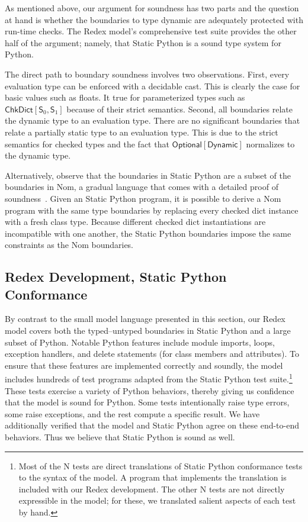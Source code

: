 \documentclass[english,cleveref,submission]{programming}
\newcommand{\SP}{Static Python}
\newcommand{\typefont}[1]{\mathsf{#1}}
\newcommand{\paramtype}[2]{#1[#2]}
\newcommand{\spteval}{\typefont{S}}
\newcommand{\sptdyn}{\typefont{Dynamic}}
\newcommand{\sptoptional}[1]{\paramtype{\typefont{Optional}}{#1}}
\newcommand{\sptchkdict}[2]{\paramtype{\typefont{ChkDict}}{#1, #2}}
\begin{document}
As mentioned above, our argument for soundness has two parts
and the question at hand is whether the boundaries to type dynamic
are adequately protected with run-time checks.
The Redex model's comprehensive test suite provides the other half of the
argument; namely, that \SP{} is a sound type system for Python.

The direct path to boundary soundness involves two observations.
First, every evaluation type can be enforced with a decidable cast.
This is clearly the case for basic values such as floats.
It true for parameterized types such as $\sptchkdict{\spteval_0}{\spteval_1}$
because of their strict semantics.
Second, all boundaries relate the dynamic type to an evaluation type.
There are no significant boundaries that relate a partially static type
to an evaluation type.
This is due to the strict semantics for checked types and the fact that
$\sptoptional{\sptdyn}$ normalizes to the dynamic type.

Alternatively, observe that the boundaries in \SP{} are a subset
of the boundaries in Nom, a gradual language that comes with a detailed
proof of soundness~\cite{mt-oopsla-2017,mt-oopsla-2021}.
Given an \SP{} program, it is possible to derive a Nom program with
the same type boundaries by replacing every checked dict instance
with a fresh class type.
Because different checked dict instantiations are incompatible with
one another, the \SP{} boundaries impose the same constraints as the Nom
boundaries.


\subsection{Redex Development, \SP{} Conformance}

By contrast to the small model language presented in this section,
our Redex model covers both the typed--untyped boundaries in \SP{}
and a large subset of Python.
Notable Python features include module imports, loops, exception handlers, and
delete statements (for class members and attributes).
To ensure that these features are implemented correctly and soundly, the
model includes hundreds of test programs adapted from the \SP{} test suite.\footnote{
  Most of the N tests are direct translations of \SP{} conformance tests to
  the syntax of the model.
  A program that implements the translation is included with our Redex development.
  The other N tests are not directly expressible in the model; for these, we
  translated salient aspects of each test by hand.}
These tests exercise a variety of Python behaviors, thereby giving us confidence
that the model is sound for Python.
Some tests intentionally raise type errors, some raise exceptions, and the rest
compute a specific result.
We have additionally verified that the model and \SP{} agree on these end-to-end
behaviors.
Thus we believe that \SP{} is sound as well.
\end{document}
